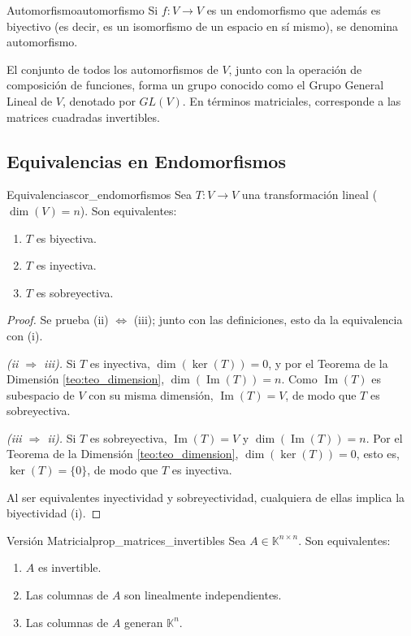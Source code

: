 \documentclass[11pt, a4paper]{article}
\begin{document}
\begin{definicion}{Automorfismo}{automorfismo}
Si $f: V \to V$ es un endomorfismo que además es biyectivo (es decir, es un isomorfismo de un espacio en sí mismo), se denomina automorfismo.
\end{definicion}

\obs El conjunto de todos los automorfismos de $V$, junto con la operación de composición de funciones, forma un grupo conocido como el Grupo General Lineal de $V$, denotado por $GL(V)$. En términos matriciales, corresponde a las matrices cuadradas invertibles.

\subsection{Equivalencias en Endomorfismos}

\begin{corolario}{Equivalencias}{cor_endomorfismos}
Sea $T: V \to V$ una transformación lineal ($\dim(V)=n$). Son equivalentes:
\begin{enumerate}
    \item[(i)] $T$ es biyectiva.
    \item[(ii)] $T$ es inyectiva.
    \item[(iii)] $T$ es sobreyectiva.
\end{enumerate}
\end{corolario}

\begin{proof}
Se prueba (ii) $\Leftrightarrow$ (iii); junto con las definiciones, esto da la equivalencia con (i).

\textit{(ii $\Rightarrow$ iii).} Si $T$ es inyectiva, $\dim(\ker(T)) = 0$, y por el Teorema de la Dimensión \ref{teo:teo_dimension}, $\dim(\operatorname{Im}(T)) = n$. Como $\operatorname{Im}(T)$ es subespacio de $V$ con su misma dimensión, $\operatorname{Im}(T) = V$, de modo que $T$ es sobreyectiva.

\textit{(iii $\Rightarrow$ ii).} Si $T$ es sobreyectiva, $\operatorname{Im}(T) = V$ y $\dim(\operatorname{Im}(T)) = n$. Por el Teorema de la Dimensión \ref{teo:teo_dimension}, $\dim(\ker(T)) = 0$, esto es, $\ker(T) = \{0\}$, de modo que $T$ es inyectiva.

Al ser equivalentes inyectividad y sobreyectividad, cualquiera de ellas implica la biyectividad (i).
\end{proof}

\begin{proposicion}{Versión Matricial}{prop_matrices_invertibles}
Sea $A \in \mathbb{K}^{n \times n}$. Son equivalentes:
\begin{enumerate}
    \item $A$ es invertible.
    \item Las columnas de $A$ son linealmente independientes.
    \item Las columnas de $A$ generan $\mathbb{K}^n$.
\end{enumerate}
\end{proposicion}
\end{document}
